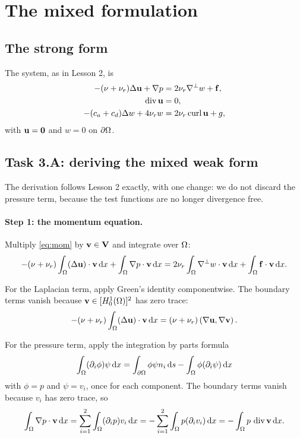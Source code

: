 \documentclass[11pt,a4paper]{article}
\newcommand{\Vsp}{\mathbf{V}}
\newcommand{\bff}{\mathbf{f}}
\newcommand{\bzero}{\mathbf{0}}
\begin{document}
\section{The mixed formulation}
\label{sec:mixed}

\subsection{The strong form}

The system, as in Lesson 2, is
\begin{align}
  -(\nu + \nu_{r}) \lap \bu + \grad p
    &= 2\nu_{r} \grad^{\perp} w + \bff , \label{eq:mom} \\
  \dive \bu &= 0 , \label{eq:incomp} \\
  -(c_{a} + c_{d}) \lap w + 4\nu_{r} w
    &= 2\nu_{r} \curl \bu + g , \label{eq:micro}
\end{align}
with $\bu = \bzero$ and $w = 0$ on $\partial\Omega$.

\subsection{Task 3.A: deriving the mixed weak form}

The derivation follows Lesson 2 exactly, with one change: we do not discard the
pressure term, because the test functions are no longer divergence free.

\paragraph{Step 1: the momentum equation.}
Multiply \eqref{eq:mom} by $\bv \in \Vsp$ and integrate over $\Omega$:
\[
  -(\nu+\nu_{r}) \int_\Om (\lap \bu)\cdot \bv \dx
  + \int_\Om \grad p \cdot \bv \dx
  = 2\nu_{r} \int_\Om \grad^{\perp} w \cdot \bv \dx
  + \int_\Om \bff \cdot \bv \dx .
\]

For the Laplacian term, apply Green's identity componentwise. The boundary terms
vanish because $\mathbf{v} \in [H^{1}_{0}(\Omega)]^{2}$ has zero trace:
\[
  -(\nu+\nu_{r}) \int_\Omega (\Delta \mathbf{u})\cdot \mathbf{v} \,\mathrm{d}x
  = (\nu+\nu_{r}) \left( \nabla \mathbf{u} , \nabla \mathbf{v} \right) .
\]

For the pressure term, apply the integration by parts formula
\[
  \int_\Omega (\partial_{i}\phi)\psi \,\mathrm{d}x
  = \int_{\partial\Omega} \phi \psi n_{i} \,\mathrm{d}s - \int_\Omega \phi(\partial_{i}\psi) \,\mathrm{d}x
\]
with $\phi = p$ and $\psi = v_{i}$, once for each component. The boundary terms
vanish because $v_{i}$ has zero trace, so
\begin{equation}\label{eq:pressure-term}
  \int_\Omega \nabla p \cdot \mathbf{v} \,\mathrm{d}x
  = \sum_{i=1}^{2} \int_\Omega (\partial_{i}p) v_{i} \,\mathrm{d}x
  = - \sum_{i=1}^{2} \int_\Omega p (\partial_{i}v_{i}) \,\mathrm{d}x
  = - \int_\Omega p \,\operatorname{div} \mathbf{v} \,\mathrm{d}x .
\end{equation}
\end{document}
